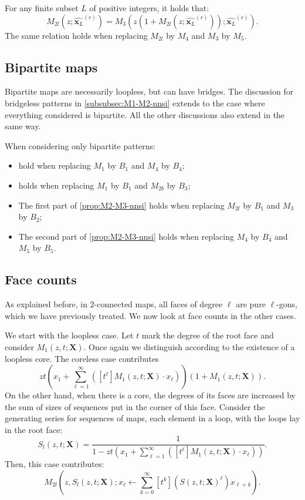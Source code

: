 \documentclass[a4paper,UKenglish,cleveref, autoref, thm-restate]{lipics-v2021}
\renewcommand{\(}{\left(}
\renewcommand{\)}{\right)}
\newcommand{\ellgon}{pure \texorpdfstring{$\ell$}{ell}-gon}
\newcommand{\ellgons}{\ellgon s}
\newcommand{\withroot}{^{(r)}}
\newcommand{\subfamily}{_L}
\newcommand{\xface}{x_{\ell}}
\newcommand{\x}{\mathbf{x}\subfamily}
\newcommand{\X}{\mathbf{X}}
\newcommand{\xallgons}{\widehat{\x}}
\newcommand{\xallgonsr}{\xallgons\withroot}
\begin{document}
\begin{proposition}
\label{prop:M2-M3-nnsi}
For any finite subset $L$ of positive integers, it holds that:
\[M_{2l}(z;\xallgonsr) = M_3(z (1+M_{2l}(z;\xallgonsr));\xallgonsr).\]
The same relation holds when replacing $M_{2l}$ by $M_4$ and $M_3$ by $M_5$.
\end{proposition}

\subsection{Bipartite maps}
Bipartite maps are necessarily loopless, but can have bridges. The discussion for bridgeless patterns in \cref{subsubsec:M1-M2-nnsi} extends to the case where everything considered is bipartite. All the other discussions also extend in the same way.

\begin{proposition}
When considering only bipartite patterns:
\begin{itemize}
    \item {} hold when replacing $M_1$ by $B_1$ and $M_4$ by $B_4$;
    \item {} holds when replacing $M_1$ by $B_1$ and $M_{2b}$ by $B_3$;
    \item The first part of \cref{prop:M2-M3-nnsi} holds when replacing $M_{2l}$ by $B_1$ and $M_3$ by $B_2$;
    \item The second part of \cref{prop:M2-M3-nnsi} holds when replacing $M_4$ by $B_4$ and $M_5$ by $B_5$.
\end{itemize}
\end{proposition}

\subsection{Face counts}
As explained before, in $2$-connected maps, all faces of degree $\ell$ are \ellgons, which we have previously treated. We now look at face counts in the other cases.

We start with the loopless case. Let $t$ mark the degree of the root face and consider $M_1(z,t;\X)$. Once again we distinguish according to the existence of a loopless core. The coreless case contributes
\[zt\(x_1 + \sum_{\ell=1}^\infty\([t^\ell] M_1\(z,t;\X\) \cdot \xface\)\) (1 + M_1(z,t;\X)).\]
On the other hand, when there is a core, the degrees of its faces are increased by the sum of sizes of sequences put in the corner of this face. Consider the generating series for sequences of maps, each element in a loop, with the loops lay in the root face:
\[S_l(z,t;\X) = \frac{1}{1-zt\(x_1 + \sum_{\ell=1}^\infty\([t^\ell] M_1\(z,t;\X\) \cdot \xface\)\)}.\]
Then, this case contributes:
\[M_{2l}\(z, S_l(z,t;\X); \xface \leftarrow \sum_{k=0}^{\infty} [t^k] (S(z,t;\X)^\ell ) x_{\ell+k}\).\]
\end{document}
